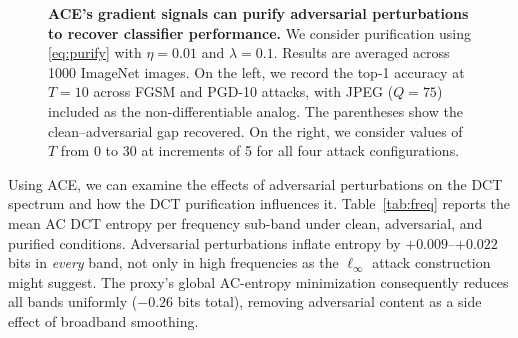 \documentclass{article}
\theoremstyle{definition}
\begin{document}
\begin{figure}[ht]
\begin{minipage}[t]{0.51\linewidth}
  \end{minipage}
  \caption{
  \textbf{ACE's gradient signals can purify adversarial perturbations to recover classifier performance.}
  We consider purification using \eqref{eq:purify} with $\eta=0.01$ and $\lambda=0.1$.
  Results are averaged across 1000 ImageNet images.
  On the left, we record the top-1 accuracy at $T{=}10$ across FGSM and PGD-10 attacks, with JPEG ($Q{=}75$) included as the non-differentiable analog.
  The parentheses show the clean--adversarial gap recovered.
  On the right, we consider values of $T$ from 0 to 30 at increments of 5 for all four attack configurations.
  }
  \label{fig:purification}
\end{figure}

Using ACE, we can examine the effects of adversarial perturbations on the DCT spectrum and how the DCT purification influences it.
Table~\ref{tab:freq} reports the mean AC DCT entropy per frequency sub-band under clean, adversarial, and purified conditions.
Adversarial perturbations inflate entropy by $+0.009$--$+0.022$ bits in \emph{every} band, not only in high frequencies as the $\ell_\infty$ attack construction might suggest.
The proxy's global AC-entropy minimization consequently reduces all bands uniformly ($-0.26$ bits total), removing adversarial content as a side effect of broadband smoothing.
\end{document}
